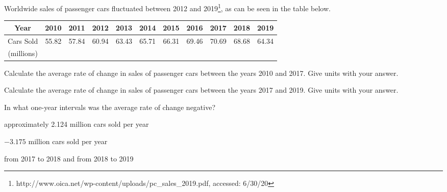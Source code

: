 \begin{exercise}
Worldwide sales of passenger cars fluctuated between 2012 and 2019\footnote{http://www.oica.net/wp-content/uploads/pc\_sales\_2019.pdf, accessed: 6/30/20}, as can be seen in the table below.
\begin{center}\scriptsize
\begin{tabular}{|c|c|c|c|c|c|c|c|c|c|c|}
\hline Year  & 2010 & 2011 & 2012 & 2013 & 2014 & 2015 & 2016 & 2017 & 2018 & 2019
\\\hline Cars Sold & 55.82 & 57.84 & 60.94 & 63.43 & 65.71 & 66.31 & 69.46 & 70.69 & 68.68 & 64.34 
\\ (millions) & & & & & & & & & &
\\\hline
\end{tabular}
\end{center}

    \begin{parts}
        \item Calculate the average rate of change in sales of passenger cars between the years 2010 and 2017. Give units with your answer.

        \item Calculate the average rate of change in sales of passenger cars between the years 2017 and 2019. Give units with your answer.

        \item In what one-year intervals was the average rate of change negative?
    \end{parts}

\end{exercise}


\begin{solution}
    \begin{parts}
        \item approximately 2.124 million cars sold per year
        \item $-3.175$ million cars sold per year
        \item from 2017 to 2018 and from 2018 to 2019
    \end{parts}
\end{solution}